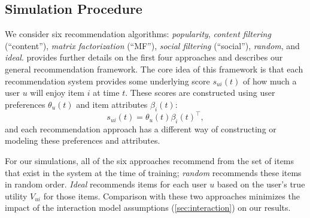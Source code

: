 \documentclass[sigconf]{acmart}
\begin{document}
\subsection{Simulation Procedure}

We consider six recommendation algorithms: \emph{popularity}, \emph{content filtering} (``content''), \emph{matrix factorization} (``MF''), \emph{social filtering} (``social''), \emph{random}, and \emph{ideal}.
 provides further details on the first four approaches and describes our general recommendation framework.  The core idea of this framework is that each recommendation system provides some underlying score $s_{ui}(t)$ of how much a user $u$ will enjoy item $i$ at time $t$.  These scores are constructed using user preferences $\theta_u(t)$ and item attributes $\beta_i(t)$:
\begin{equation}
s_{ui}(t) = \theta_u(t) \beta_i(t)^\top,
\label{eq:rec_score_main}
\end{equation} and each recommendation approach has a different way of constructing or modeling these preferences and attributes.

For our simulations, all of the six approaches recommend from the set of items that exist in the system at the time of training; \emph{random} recommends these items in random order.  \emph{Ideal} recommends items for each user $u$ based on the user's true utility $V_{ui}$ for those items.  Comparison with these two approaches minimizes the impact of the interaction model assumptions (\cref{sec:interaction}) on our results.
\end{document}
